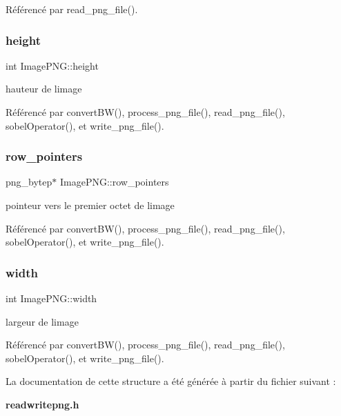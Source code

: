 Référencé par read\+\_\+png\+\_\+file().

\mbox{\label{structImagePNG_a22fa899749010ffdde3a9f2ca1baf5e4}} 
\subsubsection{height}
{\footnotesize\ttfamily int Image\+P\+N\+G\+::height}

hauteur de l\textquotesingle{}image 

Référencé par convert\+B\+W(), process\+\_\+png\+\_\+file(), read\+\_\+png\+\_\+file(), sobel\+Operator(), et write\+\_\+png\+\_\+file().

\mbox{\label{structImagePNG_a701cf7bb95ae374f8bd08594fb098b7b}} 
\subsubsection{row\+\_\+pointers}
{\footnotesize\ttfamily png\+\_\+bytep$\ast$ Image\+P\+N\+G\+::row\+\_\+pointers}

pointeur vers le premier octet de l\textquotesingle{}image 

Référencé par convert\+B\+W(), process\+\_\+png\+\_\+file(), read\+\_\+png\+\_\+file(), sobel\+Operator(), et write\+\_\+png\+\_\+file().

\mbox{\label{structImagePNG_a950f3eeb0fc775b73fa6dbe8774afd7b}} 
\subsubsection{width}
{\footnotesize\ttfamily int Image\+P\+N\+G\+::width}

largeur de l\textquotesingle{}image 

Référencé par convert\+B\+W(), process\+\_\+png\+\_\+file(), read\+\_\+png\+\_\+file(), sobel\+Operator(), et write\+\_\+png\+\_\+file().



La documentation de cette structure a été générée à partir du fichier suivant \+:\begin{DoxyCompactItemize}
\item 
\textbf{ readwritepng.\+h}\end{DoxyCompactItemize}
